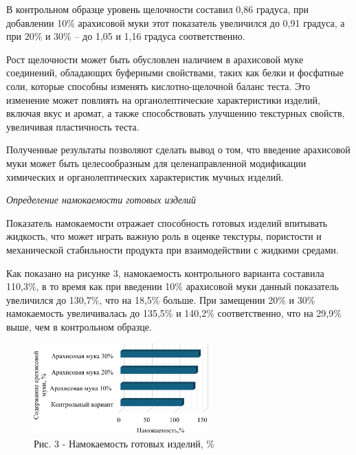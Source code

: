 \begin{multicols}{2}
В контрольном образце уровень щелочности составил 0,86 градуса, при
добавлении 10\% арахисовой муки этот показатель увеличился до 0,91
градуса, а при 20\% и 30\% -- до 1,05 и 1,16 градуса соответственно.

Рост щелочности может быть обусловлен наличием в арахисовой муке
соединений, обладающих буферными свойствами, таких как белки и фосфатные
соли, которые способны изменять кислотно-щелочной баланс теста. Это
изменение может повлиять на органолептические характеристики изделий,
включая вкус и аромат, а также способствовать улучшению текстурных
свойств, увеличивая пластичность теста.

Полученные результаты позволяют сделать вывод о том, что введение
арахисовой муки может быть целесообразным для целенаправленной
модификации химических и органолептических характеристик мучных изделий.

\emph{Определение намокаемости готовых изделий}

Показатель намокаемости отражает способность готовых изделий впитывать
жидкость, что может играть важную роль в оценке текстуры, пористости и
механической стабильности продукта при взаимодействии с жидкими средами.

Как показано на рисунке 3, намокаемость контрольного варианта составила
110,3\%, в то время как при введении 10\% арахисовой муки данный
показатель увеличился до 130,7\%, что на 18,5\% больше. При замещении
20\% и 30\% намокаемость увеличивалась до 135,5\% и 140,2\%
соответственно, что на 29,9\% выше, чем в контрольном образце.
\end{multicols}

\begin{figure}[H]
	\centering
	\includegraphics[width=0.6\textwidth]{media/pish/Graph_13}
	\caption*{Рис. 3 - Намокаемость готовых изделий, \%}
\end{figure}

